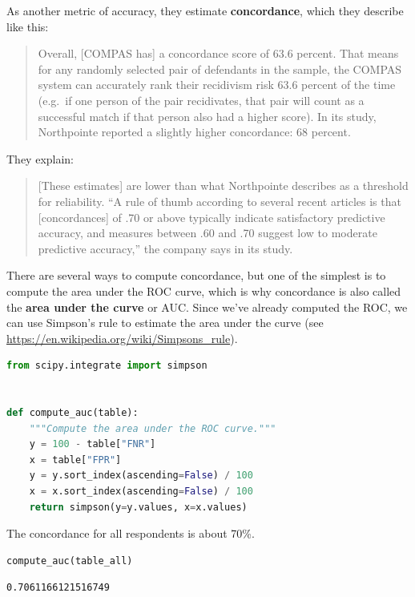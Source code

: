 As another metric of accuracy, they estimate \textbf{concordance}, which
they describe like this:

\begin{quote}
Overall, {[}COMPAS has{]} a concordance score of 63.6 percent. That
means for any randomly selected pair of defendants in the sample, the
COMPAS system can accurately rank their recidivism risk 63.6 percent of
the time (e.g.~if one person of the pair recidivates, that pair will
count as a successful match if that person also had a higher score). In
its study, Northpointe reported a slightly higher concordance: 68
percent.
\end{quote}

They explain:

\begin{quote}
{[}These estimates{]} are lower than what Northpointe describes as a
threshold for reliability. ``A rule of thumb according to several recent
articles is that {[}concordances{]} of .70 or above typically indicate
satisfactory predictive accuracy, and measures between .60 and .70
suggest low to moderate predictive accuracy,'' the company says in its
study.
\end{quote}

There are several ways to compute concordance, but one of the simplest
is to compute the area under the ROC curve, which is why concordance is
also called the \textbf{area under the curve} or AUC. Since we've
already computed the ROC, we can use Simpson's rule to estimate the area
under the curve (see \url{https://en.wikipedia.org/wiki/Simpsons_rule}).

\begin{lstlisting}[language=Python,style=source]
from scipy.integrate import simpson


def compute_auc(table):
    """Compute the area under the ROC curve."""
    y = 100 - table["FNR"]
    x = table["FPR"]
    y = y.sort_index(ascending=False) / 100
    x = x.sort_index(ascending=False) / 100
    return simpson(y=y.values, x=x.values)
\end{lstlisting}

The concordance for all respondents is about 70\%.

\begin{lstlisting}[language=Python,style=source]
compute_auc(table_all)
\end{lstlisting}

\begin{lstlisting}[style=output]
0.7061166121516749
\end{lstlisting}

